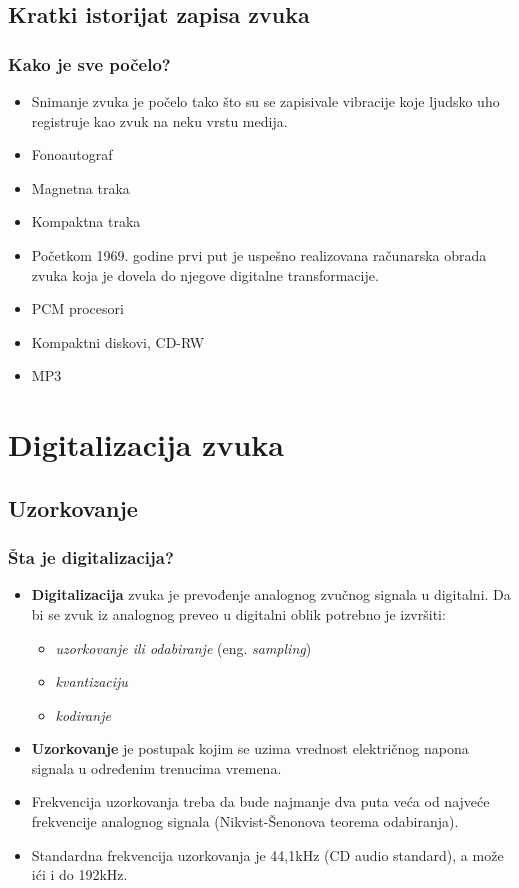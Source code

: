 \documentclass{beamer}
\begin{document}
\subsection{Kratki istorijat zapisa zvuka}
\begin{frame}[fragile]\frametitle{Kako je sve počelo?}
	\begin{itemize}	
		\item Snimanje zvuka je počelo tako što su se zapisivale vibracije koje ljudsko uho registruje kao zvuk na neku vrstu medija.
		\item Fonoautograf
		\item Magnetna traka
        \item Kompaktna traka
		\item Početkom 1969. godine prvi put je uspešno realizovana računarska obrada zvuka koja je dovela do njegove digitalne transformacije.
		\item PCM procesori
		\item Kompaktni diskovi, CD-RW
		\item MP3
	\end{itemize}
\end{frame}

\section{Digitalizacija zvuka}
\subsection{Uzorkovanje}
\begin{frame}[fragile]\frametitle{Šta je digitalizacija?}
\begin{itemize}
	\item \textbf{Digitalizacija} zvuka je prevođenje analognog zvučnog signala u digitalni. Da bi se zvuk iz analognog preveo u digitalni oblik potrebno je izvršiti:
    \begin{itemize}			
		\item \textit{uzorkovanje ili odabiranje} (eng. \textit{sampling})
		\item \textit{kvantizaciju}
        \item \textit{kodiranje}
    \end{itemize}
	\item \textbf{Uzorkovanje} je postupak kojim se uzima vrednost električnog napona signala u određenim trenucima vremena.
	\item Frekvencija uzorkovanja treba da bude najmanje dva puta veća od najveće frekvencije analognog signala (Nikvist-Šenonova teorema odabiranja).
	\item Standardna frekvencija uzorkovanja je 44,1kHz (CD audio standard), a može ići i do 192kHz. 
\end{itemize}

\end{frame}
\end{document}
